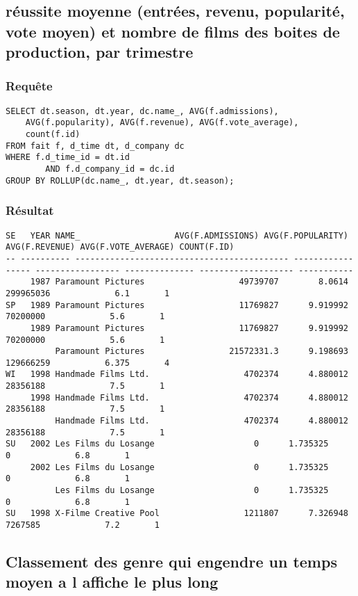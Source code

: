 \subsection{réussite moyenne (entrées, revenu, popularité, vote moyen) et nombre de films des boites de production, par trimestre}
\subsubsection{Requête}
\begin{lstlisting}
SELECT dt.season, dt.year, dc.name_, AVG(f.admissions),
	AVG(f.popularity), AVG(f.revenue), AVG(f.vote_average),
	count(f.id)
FROM fait f, d_time dt, d_company dc
WHERE f.d_time_id = dt.id
		AND f.d_company_id = dc.id
GROUP BY ROLLUP(dc.name_, dt.year, dt.season);
\end{lstlisting}
\subsubsection{Résultat}
\begin{lstlisting}
SE	 YEAR NAME_					  AVG(F.ADMISSIONS) AVG(F.POPULARITY) AVG(F.REVENUE) AVG(F.VOTE_AVERAGE) COUNT(F.ID)
-- ---------- ------------------------------------------- ----------------- ----------------- -------------- ------------------- -----------
	 1987 Paramount Pictures				   49739707	       8.0614	   299965036		     6.1	   1
SP	 1989 Paramount Pictures				   11769827	     9.919992	    70200000		     5.6	   1
	 1989 Paramount Pictures				   11769827	     9.919992	    70200000		     5.6	   1
	      Paramount Pictures				 21572331.3	     9.198693	   129666259		   6.375	   4
WI	 1998 Handmade Films Ltd.				    4702374	     4.880012	    28356188		     7.5	   1
	 1998 Handmade Films Ltd.				    4702374	     4.880012	    28356188		     7.5	   1
	      Handmade Films Ltd.				    4702374	     4.880012	    28356188		     7.5	   1
SU	 2002 Les Films du Losange					  0	     1.735325		   0		     6.8	   1
	 2002 Les Films du Losange					  0	     1.735325		   0		     6.8	   1
	      Les Films du Losange					  0	     1.735325		   0		     6.8	   1
SU	 1998 X-Filme Creative Pool				    1211807	     7.326948	     7267585		     7.2	   1

\end{lstlisting}

\subsection{Classement des genre qui engendre un temps moyen a l affiche le plus long}
